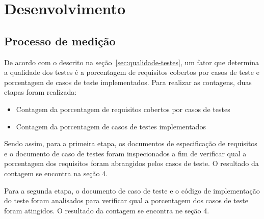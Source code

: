 \chapter[Desenvolvimento ]{Desenvolvimento}

\section{Processo de medição}
De acordo com o descrito na seção~\ref{sec:qualidade-testes}, um fator que determina a qualidade dos testes é a porcentagem de requisitos cobertos por casos de teste e porcentagem de casos de teste implementados. Para realizar as contagens, duas etapas foram realizada:

\begin{itemize}

	\item Contagem da porcentagem de requisitos cobertos por casos de testes
	\item Contagem da porcentagem de casos de testes implementados
	
\end{itemize}

Sendo assim, para a primeira etapa, os documentos de especificação de requisitos e o documento de caso de testes foram inspecionados a fim de verificar qual a porcentagem dos requisitos foram abrangidos pelos casos de teste. O resultado da contagem se encontra na seção 4.

Para a segunda etapa, o documento de caso de teste e o código de implementação do teste foram analisados para verificar qual a porcentagem dos casos de teste foram atingidos. O resultado da contagem se encontra ne seção 4.


